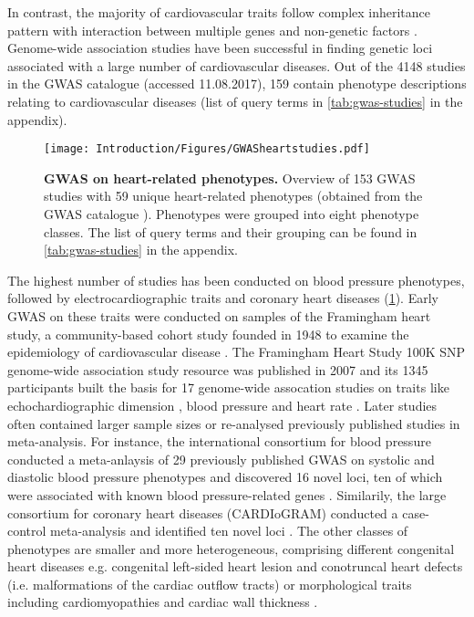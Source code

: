 In contrast, the majority of cardiovascular traits follow complex inheritance pattern with interaction between multiple genes and non-genetic factors \citep{Kathiresan2012}. Genome-wide association studies have been successful in finding genetic loci associated with a large number of cardiovascular diseases. Out of the \num{4148} studies in the GWAS catalogue (accessed 11.08.2017), \num{159} contain phenotype descriptions relating to cardiovascular diseases (list of query terms in \cref{tab:gwas-studies} in the appendix).
\\
\begin{figure}[hbtp]
	\centering
	\texttt{[image: Introduction/Figures/GWASheartstudies.pdf]}
	\caption[\textbf{GWAS on heart-related phenotypes. }]{\textbf{GWAS on heart-related phenotypes. } Overview of \num{153} GWAS studies with \num{59} unique heart-related phenotypes (obtained from the GWAS catalogue \citep[accessed on 11.08.2017]{MacArthur2017}). Phenotypes were grouped into eight phenotype classes. The list of query terms and their grouping can be found in \cref{tab:gwas-studies} in the appendix.} 
	 	\label{fig:gwas-heart}
\end{figure}

The highest number of studies has been conducted on blood pressure phenotypes, followed by electrocardiographic traits and coronary heart diseases (\cref{fig:gwas-heart}). Early GWAS on these traits were conducted on samples of the Framingham heart study, a community-based cohort study founded in 1948 to examine the epidemiology of cardiovascular disease \citep{Dawber1951,Kannel1979}. The Framingham Heart Study 100K SNP genome-wide association study resource was published in 2007 \citep{Cupples2007} and its \num{1345} participants built the basis for \num{17} genome-wide assocation studies on traits like echochardiographic dimension \citep{Vasan2007}, blood pressure \citep{Levy2007} and heart rate \citep{Newton-Cheh2007}. Later studies often contained larger sample sizes or re-analysed previously published studies in meta-analysis. For instance, the international consortium for blood pressure conducted a meta-anlaysis of \num{29} previously published GWAS on systolic and diastolic blood pressure phenotypes and discovered \num{16} novel loci, ten of which were associated with known blood pressure-related genes \citep{Ehret2011}. Similarily, the large consortium for coronary heart diseases  (CARDIoGRAM)  conducted a case-control meta-analysis  and identified ten novel loci  \citep{Nikpay2015}. The other classes of phenotypes are smaller and more heterogeneous, comprising different congenital heart diseases e.g. congenital left-sided heart lesion \citep{Mitchell2015,Hanchard2016} and conotruncal heart defects (i.e. malformations of the cardiac outflow tracts) \citep{Agopian2014} or morphological traits including cardiomyopathies \citep{ Villard2011} and cardiac wall thickness \citep{Vasan2009,Arnett2011}. 

